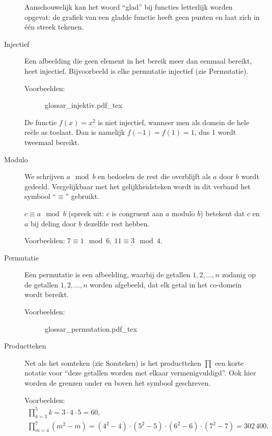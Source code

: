 \begin{description}
		Aanschouwelijk kan het woord \enquote{glad} bij functies letterlijk wor\-den opgevat: de grafiek van een gladde functie heeft geen punten en laat zich in één streek tekenen.

	\item[Injectief] Een afbeelding die geen element in het bereik meer dan eenmaal bereikt, heet injectief. Bijvoorbeeld is elke permutatie injectief (zie Permutatie).

		Voorbeelden:
		\begin{figure}
			\def\svgwidth{200pt}
			{glossar_injektiv.pdf_tex}
		\end{figure}
		De functie $f(x) = x^2$ is niet injectief, wanneer men als domein de hele reële as toelaat. Dan is namelijk $f(-1) = f(1) = 1$, dus 1 wordt tweemaal bereikt.

	\item[Modulo] We schrijven $a \mod b$ en bedoelen de rest die overblijft als $a$ door $b$ wordt gedeeld. Vergelijkbaar met het gelijkheidsteken wordt in dit verband het symbool \enquote{$\equiv$} gebruikt.

		$c \equiv a \mod b$ (spreek uit: $c$ is congruent aan $a$ modulo $b$) bete\-kent dat $c$ en $a$ bij deling door $b$ dezelfde rest hebben.

		Voorbeelden: $7 \equiv 1 \mod 6,\ 11 \equiv 3 \mod 4$.

\clearpage

	\item[Permutatie] Een permutatie is een afbeelding, waarbij de getallen $1,2,\dotsc,n$ zodanig op de getallen $1,2,\dotsc,n$ worden afgebeeld, dat elk getal in het co-domein wordt bereikt.

		Voorbeelden:
		\begin{figure}
			\def\svgwidth{200pt}
			{glossar_permutation.pdf_tex}
		\end{figure}

	\item[Productteken] Net als het somteken (zie Somteken) is het product\-teken $\prod$ een korte notatie voor \enquote{deze getallen worden met elkaar vermenigvuldigd}. Ook hier worden de grenzen onder en boven het symbool geschreven.

		Voorbeelden:
		\begin{gather*}
			\prod\limits_{k=3}^5 k = 3\cdot 4\cdot 5 = 60,\\
			\prod\limits_{m=4}^7 (m^2 - m) = (4^2-4)\cdot (5^2-5)\cdot (6^2-6)\cdot (7^2-7) = 302\,400.
		\end{gather*}


\end{description}
